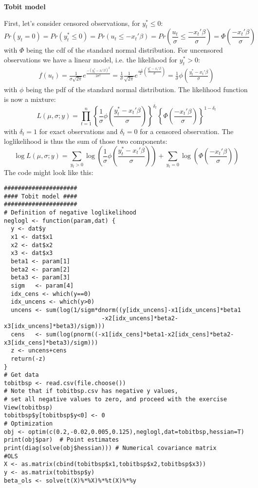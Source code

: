 \documentclass{article}
\begin{document}
\begin{solution}
\textbf{Tobit model}

First, let's consider censored observations, for $y_t^*\leq 0$:
\begin{equation*}
  Pr(y_t = 0) = Pr(y_t^* \leq 0) = Pr(u_t\leq -x_t'\beta) = Pr\left(\frac{u_t}{\sigma}\leq \frac{-x_t'\beta}{\sigma}\right) = \Phi\left(\frac{-x_t'\beta}{\sigma}\right)
\end{equation*}
with $\Phi$ being the cdf of the standard normal distribution. For uncensored observations we have a linear model, i.e. the likelihood for $y_t^*> 0$:
\begin{align*}
  f(u_t) = \frac{1}{\sigma\sqrt{2\pi}}e^{\frac{-(y_t^*-x_t'\beta)^2}{2\sigma^2}} = \frac{1}{\sigma} \frac{1}{\sqrt{2\pi}}e^{\frac{-1}{2}\left(\frac{y_t^*-x_t'\beta}{\sigma}\right)} = \frac{1}{\sigma}\phi\left(\frac{y_t^*-x_t'\beta}{\sigma}\right)
\end{align*}
with $\phi$ being the pdf of the standard normal distribution. The likelihood function is now a mixture:
\begin{equation*}
L(\mu,\sigma; y) = \prod_{t=1}^n\left\{ \frac{1}{\sigma}\phi\left(\frac{y_t^*-x_t'\beta}{\sigma}\right)\right\}^{\delta_t}
\left\{\Phi\left(\frac{-x_t'\beta}{\sigma}\right)\right\}^{1-\delta_t}
\end{equation*}
with $\delta_t=1$ for exact observations and $\delta_t=0$ for a censored observation. The loglikelihood is thus the sum of those two components:
\begin{equation*}
\log L(\mu,\sigma; y) = \sum_{y_t>0} \log\left(\frac{1}{\sigma}\phi\left(\frac{y_t^*-x_t'\beta}{\sigma}\right)\right) +
\sum_{y_t=0} \log\left(\Phi\left(\frac{-x_t'\beta}{\sigma}\right)\right)
\end{equation*}
The code might look like this:
\begin{verbatim}
#####################
#### Tobit model ####
#####################
# Definition of negative loglikelihood
neglogl <- function(param,dat) {
  y <- dat$y
  x1 <- dat$x1
  x2 <- dat$x2
  x3 <- dat$x3
  beta1 <- param[1]
  beta2 <- param[2]
  beta3 <- param[3]
  sigm   <- param[4]
  idx_cens <- which(y==0)
  idx_uncens <- which(y>0)
  uncens <- sum(log(1/sigm*dnorm((y[idx_uncens]-x1[idx_uncens]*beta1
                            -x2[idx_uncens]*beta2-x3[idx_uncens]*beta3)/sigm)))
  cens   <- sum(log(pnorm((-x1[idx_cens]*beta1-x2[idx_cens]*beta2-x3[idx_cens]*beta3)/sigm)))
  z <- uncens+cens
  return(-z)
}
# Get data
tobitbsp <- read.csv(file.choose())
# Note that if tobitbsp.csv has negative y values,
# set all negative values to zero, and proceed with the exercise
View(tobitbsp)
tobitbsp$y[tobitbsp$y<0] <- 0
# Optimization
obj <- optim(c(0.2,-0.02,0.005,0.125),neglogl,dat=tobitbsp,hessian=T)
print(obj$par)  # Point estimates
print(diag(solve(obj$hessian))) # Numerical covariance matrix
#OLS
X <- as.matrix(cbind(tobitbsp$x1,tobitbsp$x2,tobitbsp$x3))
y <- as.matrix(tobitbsp$y)
beta_ols <- solve(t(X)%*%X)%*%t(X)%*%y
\end{verbatim}


\end{solution}
\end{document}
